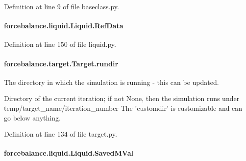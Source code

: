 Definition at line 9 of file baseclass.\-py.

\hypertarget{classforcebalance_1_1liquid_1_1Liquid_a472f32bbaf18b8ead19b9156f305b8fc}{
\paragraph[{Ref\-Data}]{\setlength{\rightskip}{0pt plus 5cm}forcebalance.\-liquid.\-Liquid.\-Ref\-Data}}\label{classforcebalance_1_1liquid_1_1Liquid_a472f32bbaf18b8ead19b9156f305b8fc}


Definition at line 150 of file liquid.\-py.

\hypertarget{classforcebalance_1_1target_1_1Target_a6872de5b2d4273b82336ea5b0da29c9e}{
\paragraph[{rundir}]{\setlength{\rightskip}{0pt plus 5cm}forcebalance.\-target.\-Target.\-rundir\hspace{0.3cm}{\ttfamily [inherited]}}}\label{classforcebalance_1_1target_1_1Target_a6872de5b2d4273b82336ea5b0da29c9e}


The directory in which the simulation is running -\/ this can be updated. 

Directory of the current iteration; if not None, then the simulation runs under temp/target\-\_\-name/iteration\-\_\-number The 'customdir' is customizable and can go below anything.

Definition at line 134 of file target.\-py.

\hypertarget{classforcebalance_1_1liquid_1_1Liquid_a5b9df1bf79a641156429e292f47b6afd}{
\paragraph[{Saved\-M\-Val}]{\setlength{\rightskip}{0pt plus 5cm}forcebalance.\-liquid.\-Liquid.\-Saved\-M\-Val}}\label{classforcebalance_1_1liquid_1_1Liquid_a5b9df1bf79a641156429e292f47b6afd}


